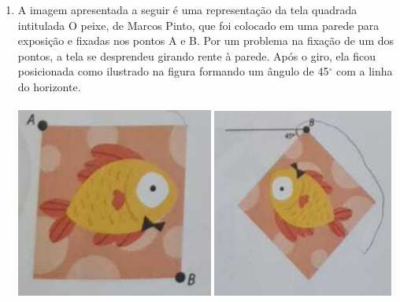 \documentclass[a4paper,14pt]{article}
\begin{document}
\begin{multicols}{2}
\begin{enumerate}
        	\item A imagem apresentada a seguir é uma representação da tela quadrada intitulada O peixe, de Marcos Pinto, que foi colocado em uma parede para exposição e fixadas nos pontos A e B. Por um problema na fixação de um dos pontos, a tela se desprendeu girando rente à parede. Após o giro, ela ficou posicionada como ilustrado na figura formando um ângulo de 45$^\circ$  com a linha do horizonte. \\\\
        	\includegraphics[width=1\linewidth]{1MMA01_imagens/imagem03}
        	\includegraphics[width=1\linewidth]{1MMA01_imagens/imagem04}

\end{enumerate}
\end{multicols}
\end{document}
